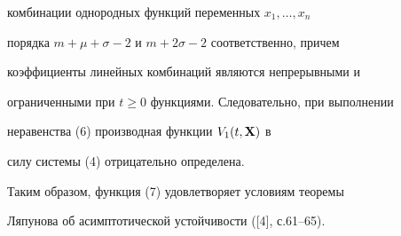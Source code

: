 \begin{pf}
комбинации однородных функций переменных $x_1,\dotsc,x_n$ 


порядка $m+\mu+\sigma-2$ и $m+2\sigma-2$ соответственно, причем 


коэффициенты линейных комбинаций являются непрерывными и 


ограниченными при $t\ge 0$ функциями. Следовательно, при выполнении 


неравенства (6) производная функции $V_1(t,\bold X)$ в 


силу системы (4) отрицательно определена. 


 


Таким образом, функция (7) удовлетворяет условиям теоремы 


Ляпунова об асимптотической устойчивости ([4], с.61--65). 


\end{pf} 


 


